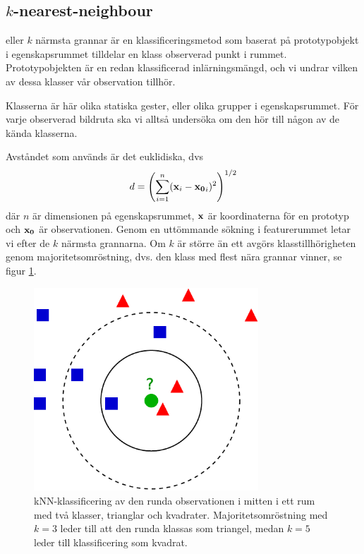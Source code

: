 \documentclass[../rapport_MVEX01-11-05]{subfiles}
\begin{document}
\subsection{$k$-nearest-neighbour}\label{sec:knn}

\knn eller $k$ närmsta grannar är en klassificeringsmetod som baserat på
prototypobjekt i egenskapsrummet tilldelar en klass observerad punkt i rummet.
Prototypobjekten är en redan klassificerad inlärningsmängd, och vi undrar vilken
av dessa klasser vår observation tillhör.

Klasserna är här olika statiska gester, eller olika grupper i egenskapsrummet. För
varje observerad bildruta ska vi alltså undersöka om den hör till någon av de
kända klasserna.

Avståndet som används är det euklidiska, dvs
\begin{equation*}
    d = \left(\sum_{i=1}^n(\mathbf{x}_i-\mathbf{x_0}_i)^2\right)^{1/2}
\end{equation*}
där $n$ är dimensionen på egenskapsrummet, $\mathbf{x}$ är koordinaterna för en
prototyp och $\mathbf{x_0}$ är observationen. Genom en uttömmande sökning i
featurerummet letar vi efter de $k$ närmsta grannarna. Om $k$ är större än ett
avgörs klasstillhörigheten genom majoritetsomröstning, dvs. den klass med flest
nära grannar vinner, se figur \ref{fig:knn-overview}.

\begin{figure}[!htb]
    \begin{center}
\includegraphics[width=0.75\textwidth]{bilder/KnnClassification}
    \end{center}
    \caption{kNN-klassificering av den runda observationen i mitten i ett rum
    med två klasser, trianglar och kvadrater. Majoritetsomröstning
    med $k=3$ leder till att den runda klassas som triangel, medan $k=5$ leder
    till klassificering som kvadrat.}
    \label{fig:knn-overview}
\end{figure}
\end{document}
